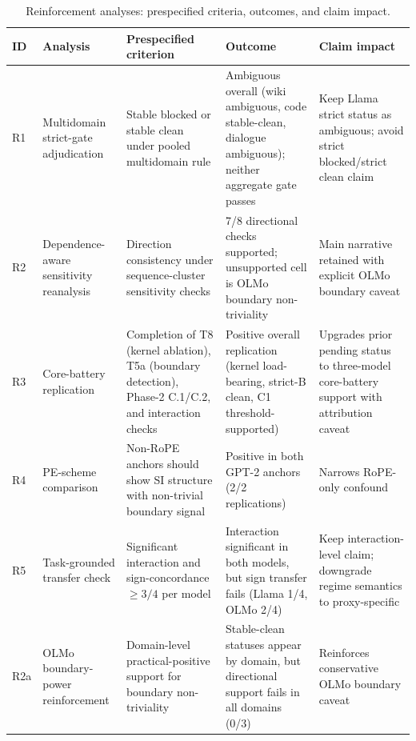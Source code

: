 \documentclass{article}
\begin{document}
\begin{table}[htbp]
    \caption{Reinforcement analyses: prespecified criteria, outcomes, and claim impact.}
    \centering
    \small
    \begin{tabular}{p{0.8cm}p{2.3cm}p{2.5cm}p{2.7cm}p{2.9cm}}
        \toprule
        ID & Analysis & Prespecified criterion & Outcome & Claim impact \\
        \midrule
        R1 &
        Multidomain strict-gate adjudication &
        Stable blocked or stable clean under pooled multidomain rule &
        Ambiguous overall (wiki ambiguous, code stable-clean, dialogue ambiguous); neither aggregate gate passes &
        Keep Llama strict status as ambiguous; avoid strict blocked/strict clean claim \\

        R2 &
        Dependence-aware sensitivity reanalysis &
        Direction consistency under sequence-cluster sensitivity checks &
        7/8 directional checks supported; unsupported cell is OLMo boundary non-triviality &
        Main narrative retained with explicit OLMo boundary caveat \\

        R3 &
        Core-battery replication &
        Completion of T8 (kernel ablation), T5a (boundary detection), Phase-2 C.1/C.2, and interaction checks &
        Positive overall replication (kernel load-bearing, strict-B clean, C1 threshold-supported) &
        Upgrades prior pending status to three-model core-battery support with attribution caveat \\

        R4 &
        PE-scheme comparison &
        Non-RoPE anchors should show SI structure with non-trivial boundary signal &
        Positive in both GPT-2 anchors (2/2 replications) &
        Narrows RoPE-only confound \\

        R5 &
        Task-grounded transfer check &
        Significant interaction and sign-concordance $\geq 3/4$ per model &
        Interaction significant in both models, but sign transfer fails (Llama 1/4, OLMo 2/4) &
        Keep interaction-level claim; downgrade regime semantics to proxy-specific \\

        R2a &
        OLMo boundary-power reinforcement &
        Domain-level practical-positive support for boundary non-triviality &
        Stable-clean statuses appear by domain, but directional support fails in all domains (0/3) &
        Reinforces conservative OLMo boundary caveat \\


\end{tabular}
\end{table}
\end{document}
